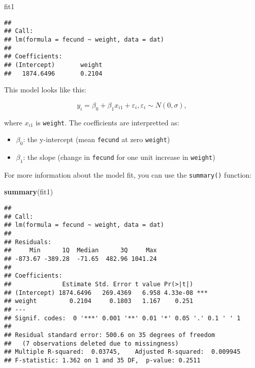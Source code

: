 \documentclass[]{book}
\newenvironment{Shaded}{\begin{snugshade}}{\end{snugshade}}
\newcommand{\KeywordTok}[1]{\textcolor[rgb]{0.13,0.29,0.53}{\textbf{#1}}}
\newcommand{\NormalTok}[1]{#1}
\providecommand{\tightlist}{%
  \setlength{\itemsep}{0pt}\setlength{\parskip}{0pt}}
\theoremstyle{definition}
\theoremstyle{definition}
\theoremstyle{definition}
\theoremstyle{remark}
\begin{document}
\begin{Shaded}
\begin{Highlighting}[]
\NormalTok{fit1}
\end{Highlighting}
\end{Shaded}

\begin{verbatim}
## 
## Call:
## lm(formula = fecund ~ weight, data = dat)
## 
## Coefficients:
## (Intercept)       weight  
##   1874.6496       0.2104
\end{verbatim}

This model looks like this:

\begin{equation}
  y_i=\beta_0 + \beta_1 x_{i1} + \varepsilon_i, \varepsilon_i \sim N(0,\sigma),
\label{eq:lin-reg}
\end{equation}

where \(x_{i1}\) is \texttt{weight}. The coefficients are interpretted
as:

\begin{itemize}
\tightlist
\item
  \(\beta_0\): the y-intercept (mean \texttt{fecund} at zero
  \texttt{weight})
\item
  \(\beta_1\): the slope (change in \texttt{fecund} for one unit
  increase in \texttt{weight})
\end{itemize}

For more information about the model fit, you can use the
\texttt{summary()} function:

\begin{Shaded}
\begin{Highlighting}[]
\KeywordTok{summary}\NormalTok{(fit1)}
\end{Highlighting}
\end{Shaded}

\begin{verbatim}
## 
## Call:
## lm(formula = fecund ~ weight, data = dat)
## 
## Residuals:
##     Min      1Q  Median      3Q     Max 
## -873.67 -389.28  -71.65  482.96 1041.24 
## 
## Coefficients:
##              Estimate Std. Error t value Pr(>|t|)    
## (Intercept) 1874.6496   269.4369   6.958 4.33e-08 ***
## weight         0.2104     0.1803   1.167    0.251    
## ---
## Signif. codes:  0 '***' 0.001 '**' 0.01 '*' 0.05 '.' 0.1 ' ' 1
## 
## Residual standard error: 500.6 on 35 degrees of freedom
##   (7 observations deleted due to missingness)
## Multiple R-squared:  0.03745,    Adjusted R-squared:  0.009945 
## F-statistic: 1.362 on 1 and 35 DF,  p-value: 0.2511
\end{verbatim}
\end{document}
